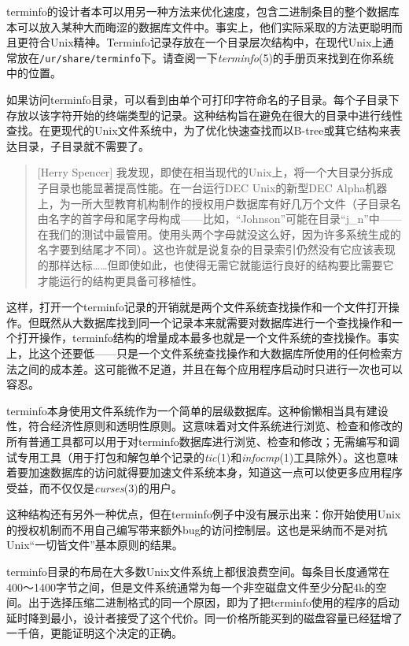 \documentclass[12pt,oneside]{book}
\begin{document}
terminfo的设计者本可以用另一种方法来优化速度，包含二进制条目的整个数据库本可以放入某种大而晦涩的数据库文件中。事实上，他们实际采取的方法更聪明而且更符合Unix精神。Terminfo记录存放在一个目录层次结构中，在现代Unix上通常放在\verb+/ur/share/terminfo+下。请查阅一下\textit{terminfo}(5)的手册页来找到在你系统中的位置。

如果访问terminfo目录，可以看到由单个可打印字符命名的子目录。每个子目录下存放以该字符开始的终端类型的记录。这种结构旨在避免在很大的目录中进行线性查找。在更现代的Unix文件系统中，为了优化快速查找而以B-tree或萁它结构来表达目录，子目录就不需要了。

\begin{quote}[Herry Spencer]
我发现，即使在相当现代的Unix上，将一个大目录分拆成子目录也能显著提高性能。在一台运行DEC Unix的新型DEC Alpha机器上，为一所大型教育机构制作的授权用户数据库有好几万个文件（子目录名由名字的首字母和尾字母构成——比如，“Johnson”可能在目录“j\_{}n”中——在我们的测试中最管用。使用头两个字母就没这么好，因为许多系统生成的名字要到结尾才不同）。这也许就是说复杂的目录索引仍然没有它应该表现的那样达标……但即使如此，也使得无需它就能运行良好的结构要比需要它才能运行的结构更具备可移植性。
\end{quote}

这样，打开一个terminfo记录的开销就是两个文件系统查找操作和一个文件打开操作。但既然从大数据库找到同一个记录本来就需要对数据库进行一个查找操作和一个打开操作，terminfo结构的增量成本最多也就是一个文件系统的查找操作。事实上，比这个还要低——只是一个文件系统查找操作和大数据库所使用的任何检索方法之间的成本差。这可能微不足道，并且在每个应用程序启动时只进行一次也可以容忍。

terminfo本身使用文件系统作为一个简单的层级数据库。这种偷懒相当具有建设性，符合经济性原则和透明性原则。这意味着对文件系统进行浏览、检查和修改的所有普通工具都可以用于对terminfo数据库进行浏览、检查和修改；无需编写和调试专用工具（用于打包和解包单个记录的\textit{tic}(1)和\textit{infocmp}(1)工具除外）。这也意味着要加速数据库的访问就得要加速文件系统本身，知道这一点可以使更多应用程序受益，而不仅仅是\textit{curses}(3)的用户。

这种结构还有另外一种优点，但在terminfo例子中没有展示出来：你开始使用Unix的授权机制而不用自己编写带来额外bug的访问控制层。这也是采纳而不是对抗Unix“一切皆文件”基本原则的结果。

terminfo目录的布局在大多数Unix文件系统上都很浪费空间。每条目长度通常在400～1400字节之间，但是文件系统通常为每一个非空磁盘文件至少分配4k的空间。出于选择压缩二进制格式的同一个原因，即为了把terminfo使用的程序的启动延时降到最小，设计者接受了这个代价。同一价格所能买到的磁盘容量已经猛增了一千倍，更能证明这个决定的正确。
\end{document}
